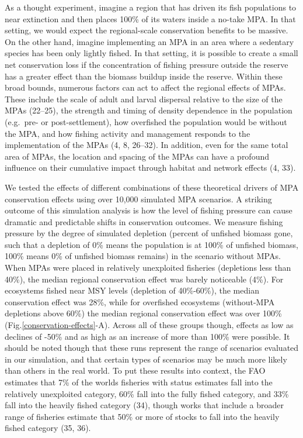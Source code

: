 \documentclass[9pt,twocolumn,twoside,lineno]{pnas-new}
\begin{document}
As a thought experiment, imagine a region that has driven its fish
populations to near extinction and then places 100\% of its waters
inside a no-take MPA. In that setting, we would expect the
regional-scale conservation benefits to be massive. On the other hand,
imagine implementing an MPA in an area where a sedentary species has
been only lightly fished. In that setting, it is possible to create a
small net conservation loss if the concentration of fishing pressure
outside the reserve has a greater effect than the biomass buildup inside
the reserve. Within these broad bounds, numerous factors can act to
affect the regional effects of MPAs. These include the scale of adult
and larval dispersal relative to the size of the MPAs (22--25), the
strength and timing of density dependence in the population (e.g.~pre-
or post-settlement), how overfished the population would be without the
MPA, and how fishing activity and management responds to the
implementation of the MPAs (4, 8, 26--32). In addition, even for the
same total area of MPAs, the location and spacing of the MPAs can have a
profound influence on their cumulative impact through habitat and
network effects (4, 33).

We tested the effects of different combinations of these theoretical
drivers of MPA conservation effects using over 10,000 simulated MPA
scenarios. A striking outcome of this simulation analysis is how the
level of fishing pressure can cause dramatic and predictable shifts in
conservation outcomes. We measure fishing pressure by the degree of
simulated depletion (percent of unfished biomass gone, such that a
depletion of 0\% means the population is at 100\% of unfished biomass,
100\% means 0\% of unfished biomass remains) in the scenario without
MPAs. When MPAs were placed in relatively unexploited fisheries
(depletions less than 40\%), the median regional conservation effect was
barely noticeable (4\%). For ecosystems fished near MSY levels
(depletion of 40\%-60\%), the median conservation effect was 28\%, while
for overfished ecosystems (without-MPA depletions above 60\%) the median
regional conservation effect was over 100\%
(Fig.\ref{conservation-effects}-A). Across all of these groups though,
effects as low as declines of -50\% and as high as an increase of more
than 100\% were possible. It should be noted though that these runs
represent the range of scenarios evaluated in our simulation, and that
certain types of scenarios may be much more likely than others in the
real world. To put these results into context, the FAO estimates that
7\% of the worlds fisheries with status estimates fall into the
relatively unexploited category, 60\% fall into the fully fished
category, and 33\% fall into the heavily fished category (34), though
works that include a broader range of fisheries estimate that 50\% or
more of stocks to fall into the heavily fished category (35, 36).
\end{document}

